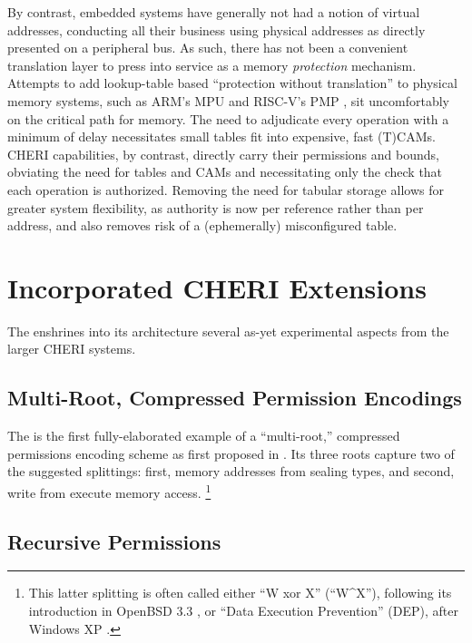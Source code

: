 By contrast, embedded systems have generally not had a notion of virtual addresses, conducting all their business using physical addresses as directly presented on a peripheral bus.
As such, there has not been a convenient translation layer to press into service as a memory \emph{protection} mechanism.
Attempts to add lookup-table based ``protection without translation'' to physical memory systems, such as ARM's MPU \cite{arm:mpu} and RISC-V's PMP \cite[\S 3.6]{RISCV:Privileged:1.10}, sit uncomfortably on the critical path for memory.
The need to adjudicate every operation with a minimum of delay necessitates small tables fit into expensive, fast (T)CAMs.
CHERI capabilities, by contrast, directly carry their permissions and bounds, obviating the need for tables and CAMs and necessitating only the check that each operation is authorized.
Removing the need for tabular storage allows for greater system flexibility, as authority is now per reference rather than per address, and also removes risk of a (ephemerally) misconfigured table.

\section{Incorporated CHERI Extensions}

The \cherimcuisa{} enshrines into its architecture several as-yet experimental aspects from the larger CHERI systems.

\subsection{Multi-Root, Compressed Permission Encodings}

The \cherimcuisa{} is the first fully-elaborated example of a ``multi-root,'' compressed permissions encoding scheme as first proposed in \cite[\S D.5]{UCAM-CL-TR-951}.
Its three roots capture two of the suggested splittings: first, memory addresses from sealing types, and second, write from execute memory access.%
%
\footnote{This latter splitting is often called either ``W xor X'' (``W\textasciicircum{}X''), following its introduction in OpenBSD 3.3 \cite{openbsd:3.3}, or ``Data Execution Prevention'' (DEP), after Windows XP \cite{msft:dep}.}

\subsection{Recursive Permissions}

